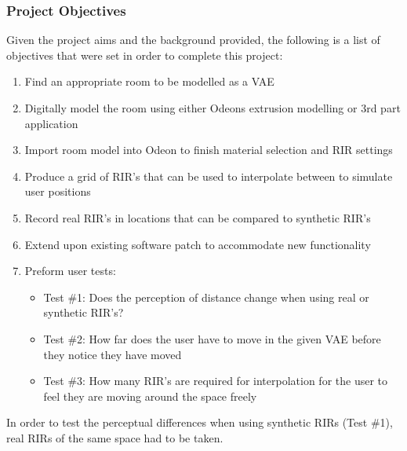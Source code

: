 \documentclass[../../main.tex]{subfiles}
\begin{document}
	\subsubsection{Project Objectives}

		Given the project aims and the background provided, the following is a list of objectives that were set in order to complete this project:

		\begin{enumerate}
			\item Find an appropriate room to be modelled as a \ac{VAE} \\
			\item Digitally model the room using either Odeons extrusion modelling or 3rd part application \\
			\item Import room model into Odeon to finish material selection and \ac{RIR} settings\\
			\item Produce a grid of \ac{RIR}'s that can be used to interpolate between to simulate user positions\\
			\item Record real \ac{RIR}'s in locations that can be compared to synthetic \ac{RIR}'s\\
			\item Extend upon existing software patch to accommodate new functionality\\
			\item Preform user tests:
				\begin{itemize}
					\item Test \#1: Does the perception of distance change when using real or synthetic \ac{RIR}'s?\\
					\item Test \#2: How far does the user have to move in the given \ac{VAE} before they notice they have moved \\
					\item Test \#3: How many \ac{RIR}'s are required for interpolation for the user to feel they are moving around the space freely\\
				\end{itemize}
			\end{enumerate}


	In order to test the perceptual differences when using synthetic RIRs (Test \#1), real RIRs of the same space had to be taken.
\end{document}
